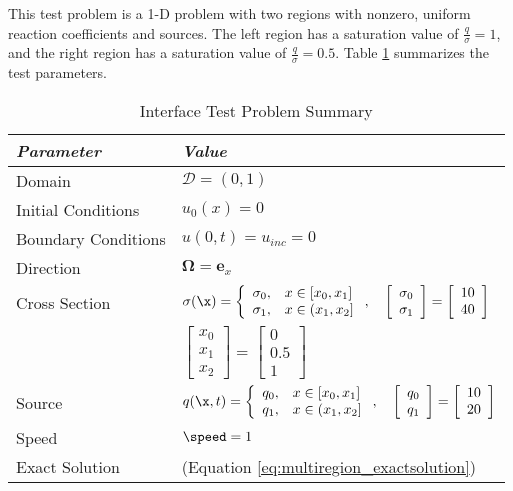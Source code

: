 This test problem is a 1-D problem with two regions with nonzero, uniform
reaction coefficients and sources. The left region has a saturation
value of $\frac{q}{\sigma}=1$, and the right region has a saturation
value of $\frac{q}{\sigma}=0.5$. 
Table \ref{tab:interface} summarizes the test parameters.

\begin{table}[htb]\caption{Interface Test Problem Summary}
\label{tab:interface}
\centering
\begin{tabular}{l l}\toprule
\emph{Parameter} & \emph{Value}\\\midrule
Domain & $\mathcal{D} = (0,1)$\\
Initial Conditions & $u_0(x)=0$\\
Boundary Conditions & $u(0,t)=u_{inc}=0$\\
Direction & $\mathbf{\Omega} = \mathbf{e}_x$\\
Cross Section & $\sigma(\x)=\left\{\begin{array}{c l}
   \sigma_0, & x\in[x_0,x_1]\\
   \sigma_1, & x\in(x_1,x_2]
   \end{array}\right.,\quad
   \left[\begin{array}{c}\sigma_0\\\sigma_1\end{array}\right] =
      \left[\begin{array}{c}10\\40\end{array}\right]$\\
   & $\left[\begin{array}{c}x_0\\x_1\\x_2\end{array}\right] =
      \left[\begin{array}{c}0\\0.5\\1\end{array}\right]$\\
Source & $q(\x,t)=\left\{\begin{array}{c l}
   q_0, & x\in[x_0,x_1]\\
   q_1, & x\in(x_1,x_2]
   \end{array}\right.,\quad
   \left[\begin{array}{c}q_0\\q_1\end{array}\right] =
      \left[\begin{array}{c}10\\20\end{array}\right]$\\
Speed & $\speed=1$\\
Exact Solution & (Equation \eqref{eq:multiregion_exactsolution})\\
\bottomrule\end{tabular}
\end{table}

